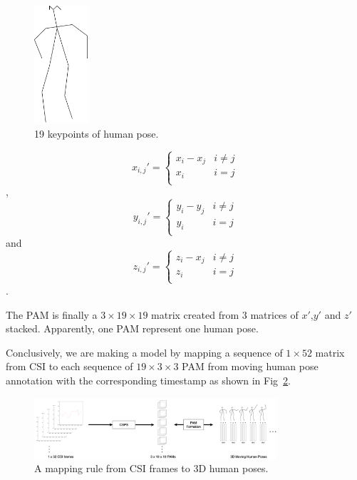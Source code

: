 \documentclass[10pt,letterpaper]{article}
\begin{document}
\begin{figure}[htbp]
	\centerline{\includegraphics[width=20mm,scale=0.5]{POSEkeypoint01.png}}
	\caption{19 keypoints of human pose.}
	\label{fig:POSEkeypoint}
\end{figure}

\begin{equation}
x_{i,j}' = \begin{cases}
x_i-x_j &\text{$i\neq j$}\\
x_i &\text{$i=j$}\\
\end{cases}
\label{eq:xPAM}
\end{equation},
\begin{equation}
y_{i,j}' = \begin{cases}
y_i-y_j &\text{$i\neq j$}\\
y_i &\text{$i=j$}\\
\end{cases}
\label{eq:yPAM}
\end{equation}
and
\begin{equation}
z_{i,j}' = \begin{cases}
z_i-x_j &\text{$i\neq j$}\\
z_i &\text{$i=j$}\\
\end{cases}
\label{eq:zPAM}
\end{equation}.

The PAM is finally a $3\times19\times19$ matrix created from 3 matrices of $x'$,$y'$ and $z'$ stacked.
Apparently, one PAM represent one human pose.



Conclusively, we are making a model by mapping a sequence of $1\times52$ matrix from CSI to each sequence of $ 19 \times 3 \times 3 $ PAM from moving human pose annotation with the corresponding timestamp as shown in Fig~\ref{fig:STEP01}. 

\begin{figure}[htbp]
	\centerline{\includegraphics[width=90mm,scale=0.5]{STEP05.png}}
	\caption{A mapping rule from CSI frames to 3D human poses.}
	\label{fig:STEP01}
\end{figure}
\end{document}
